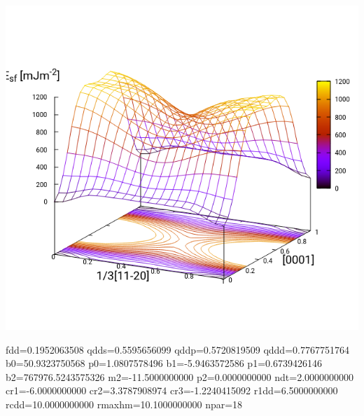 \documentclass[11pt]{article}
\begin{document}
\begin{center}
\includegraphics[width=.9\linewidth]{Images/prismatic_gs_noo_2019-11-08_pris.png}
\end{center}


fdd=0.1952063508 qdds=0.5595656099 qddp=0.5720819509 qddd=0.7767751764 b0=50.9323750568 p0=1.0807578496 b1=-5.9463572586 p1=0.6739426146 b2=767976.5243575326 m2=-11.5000000000 p2=0.0000000000 ndt=2.0000000000 cr1=-6.0000000000 cr2=3.3787908974 cr3=-1.2240415092 r1dd=6.5000000000 rcdd=10.0000000000 rmaxhm=10.1000000000 npar=18 
\end{document}
